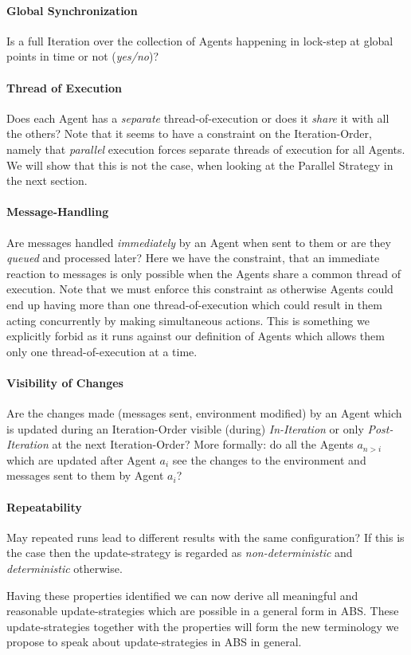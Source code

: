 \paragraph{Global Synchronization}
Is a full Iteration over the collection of Agents happening in lock-step at global points in time or not (\textit{yes/no})?

\paragraph{Thread of Execution}
Does each Agent has a \textit{separate} thread-of-execution or does it \textit{share} it with all the others? Note that it seems to have a constraint on the Iteration-Order, namely that \textit{parallel} execution forces separate threads of execution for all Agents. We will show that this is not the case, when looking at the Parallel Strategy in the next section.

\paragraph{Message-Handling}
Are messages handled \textit{immediately} by an Agent when sent to them or are they \textit{queued} and processed later? Here we have the constraint, that an immediate reaction to messages is only possible when the Agents share a common thread of execution. Note that we must enforce this constraint as otherwise Agents could end up having more than one thread-of-execution which could result in them acting concurrently by making simultaneous actions. This is something we explicitly forbid as it runs against our definition of Agents which allows them only one thread-of-execution at a time.

\paragraph{Visibility of Changes}
Are the changes made (messages sent, environment modified) by an Agent which is updated during an Iteration-Order visible (during) \textit{In-Iteration} or only \textit{Post-Iteration} at the next Iteration-Order? More formally: do all the Agents $a_{n>i}$ which are updated after Agent $a_i$ see the changes to the environment and messages sent to them by Agent $a_i$?

\paragraph{Repeatability}
May repeated runs lead to different results with the same configuration? If this is the case then the update-strategy is regarded as \textit{non-deterministic} and \textit{deterministic} otherwise.

\medskip

Having these properties identified we can now derive all meaningful and reasonable update-strategies which are possible in a general form in ABS. These update-strategies together with the properties will form the new terminology we propose to speak about update-strategies in ABS in general.
